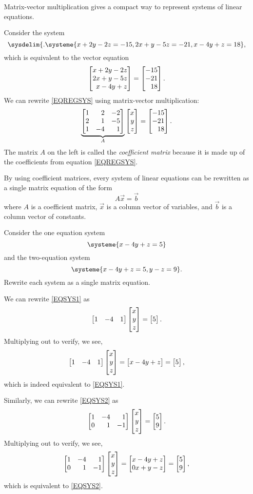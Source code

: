 Matrix-vector multiplication gives a compact way to represent systems of linear equations.

Consider the system
\begin{equation}
	\label{EQREGSYS}
	\sysdelim\{.
		\systeme{
			x+2y-2z=-15,
			2x+y-5z=-21,
			x-4y+z=18
		},
\end{equation}
which is equivalent to the vector equation
\[
	\mat{x+2y-2z\\
           2x+y-5z\\
	     x-4y+z}=\mat{-15\\-21\\18}.
\]
We can rewrite \eqref{EQREGSYS} using matrix-vector multiplication:
\[
	\underbrace{\mat{1&2&-2\\2&1&-5\\1&-4&1}}_{A}\mat{x\\y\\z}=\mat{-15\\-21\\18}.
\]
The matrix $A$ on the left is called the \emph{coefficient matrix} because it
is made up of the coefficients from equation \eqref{EQREGSYS}.

\medskip
By using coefficient matrices, every system of linear equations can be rewritten as a single matrix equation
of the form
\[
	A\vec x=\vec b
\]
where $A$ is a coefficient matrix, $\vec x$ is a column vector of variables, and $\vec b$ 
is a column vector of constants.

\begin{example}
	Consider the one equation system
	\begin{equation}
		\label{EQSYS1}
		\systeme{x-4y+z=5}
	\end{equation}
	and the two-equation system
	\begin{equation}
		\label{EQSYS2}
		\systeme{x-4y+z=5, y-z=9}.
	\end{equation}
	Rewrite each system as a single matrix equation.

	We can rewrite \eqref{EQSYS1} as 
	\[
        \mat{1&-4&1}\mat{x\\y\\z}=\mat{5}.
    \]
    Multiplying out to verify, we see,
    \[
        \mat{1&-4&1}\mat{x\\y\\z}=\mat{x-4y+z}=\mat{5},
    \]
    which is indeed equivalent to \eqref{EQSYS1}.
    
	Similarly, we can rewrite \eqref{EQSYS2} as 
	\[
       \mat{1&-4&1\\0&1&-1}\mat{x\\y\\z}=\mat{5\\9}.
    \]
    Multiplying out to verify, we see,
    \[
       \mat{1&-4&1\\0&1&-1}\mat{x\\y\\z}=\mat{x-4y+z\\0x+y-z}=\mat{5\\9},
    \]
    which is equivalent to \eqref{EQSYS2}.
\end{example}

